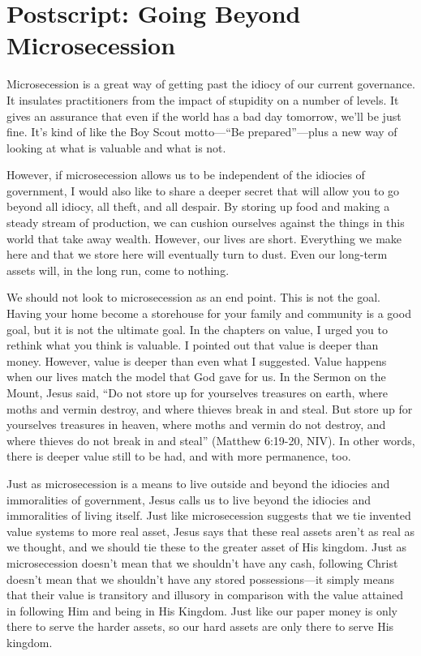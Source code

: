 \chapter*{Postscript: Going Beyond Microsecession}

Microsecession is a great way of getting past the idiocy of our current
governance. It insulates practitioners from the impact of stupidity on
a number of levels. It gives an assurance that even if the world has a
bad day tomorrow, we'll be just fine.
It's kind of like the Boy Scout motto—“Be
prepared”—plus a new way of looking at what is valuable and what is
not.

However, if microsecession allows us to be independent of the idiocies
of government, I would also like to share a deeper secret that
will allow you to go
beyond all idiocy, all theft, and all despair.  By storing up food and
making a steady stream of production, we can cushion ourselves against
the things in this world that take away wealth. However, our lives are
short. Everything we make here and that we store here will eventually
turn to dust. Even our long-term assets will, in the long run, come to
nothing.

We should not look to microsecession as an end point. This is not the
goal. Having your home become a storehouse for your family and
community is a good goal, but it is not the ultimate goal. In the
chapters on value, I urged you to rethink what you think is valuable. I
pointed out that value is deeper than money. However, value is deeper
than even what I suggested. Value happens when our lives match the
model that God gave for us. In the Sermon on the Mount, Jesus said, “Do
not store up for yourselves treasures on earth, where moths and vermin
destroy, and where thieves break in and steal. But store up for
yourselves treasures in heaven, where moths and vermin do not destroy,
and where thieves do not break in and steal” (Matthew 6:19-20, NIV). In
other words, there is deeper value still to be had, and with more
permanence, too.

Just as microsecession is a means to live outside and beyond the
idiocies and immoralities of government, Jesus calls us to live beyond
the idiocies and immoralities of living itself. Just like
microsecession suggests that we tie invented value systems to more real
asset, Jesus says that these real assets aren't as
real as we thought, and we should tie these to the greater asset of His
kingdom. Just as microsecession doesn't mean that we
shouldn't have any cash, following Christ
doesn't mean that we shouldn't have
any stored possessions—it simply means that their value is transitory
and illusory in comparison with the value attained in following
Him and being in His
Kingdom. Just like our paper money is only there to serve the harder
assets, so our hard assets are only there to serve His kingdom.

